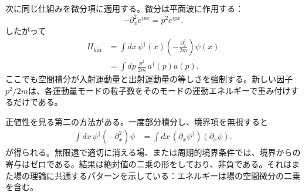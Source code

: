 次に同じ仕組みを微分項に適用する。微分は平面波に作用する：
\begin{equation}
-\partial_x^2 e^{ipx}=p^2e^{ipx}.
\end{equation}
したがって
\begin{align}
H_{\mathrm{kin}}
&=\int dx\,\psi^\dagger(x)
\left(-\frac{\partial_x^2}{2m}\right)\psi(x)\\
&=\int dp\,\frac{p^2}{2m}\,a^\dagger(p)a(p).
\label{eq:l9-kinetic-momentum}
\end{align}
ここでも空間積分が入射運動量と出射運動量の等しさを強制する。新しい因子\(p^2/2m\)は、各運動量モードの粒子数をそのモードの運動エネルギーで重み付けするだけである。

\begin{classroomqa}
\end{classroomqa}

\begin{classroomqa}
\end{classroomqa}

\begin{classroomqa}
\end{classroomqa}

正値性を見る第二の方法がある。一度部分積分し、境界項を無視すると
\begin{align}
\int dx\,\psi^\dagger(-\partial_x^2)\psi
&=\int dx\,(\partial_x\psi^\dagger)(\partial_x\psi).
\label{eq:l9-positive-kinetic}
\end{align}
が得られる。無限遠で適切に消える場、または周期的境界条件では、境界からの寄与はゼロである。結果は絶対値の二乗の形をしており、非負である。それはまた場の理論に共通するパターンを示している：エネルギーは場の空間微分の二乗を含む。

